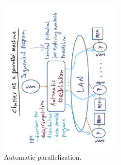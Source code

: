 \documentclass[11pt]{lecture}
\def\fullsize{0.55\textwidth}
\begin{document}
\begin{figure}[!htbp]
\centering 
\includegraphics[width=\fullsize, angle=-90]{Figures/automatic-parallel-programming}
\caption{Automatic parallelization.}\label{fig: automatic-parallel}
\end{figure}
\end{document}
